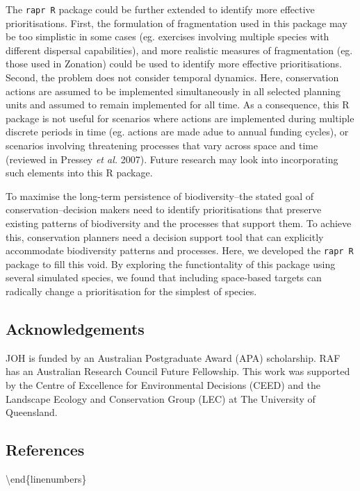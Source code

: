 \documentclass[11pt,]{article}
\begin{document}
The \texttt{rapr R} package could be further extended to identify more
effective prioritisations. First, the formulation of fragmentation used
in this package may be too simplistic in some cases (eg. exercises
involving multiple species with different dispersal capabilities), and
more realistic measures of fragmentation (eg. those used in Zonation)
could be used to identify more effective prioritisations. Second, the
problem does not consider temporal dynamics. Here, conservation actions
are assumed to be implemented simultaneously in all selected planning
units and assumed to remain implemented for all time. As a consequence,
this R package is not useful for scenarios where actions are implemented
during multiple discrete periods in time (eg. actions are made adue to
annual funding cycles), or scenarios involving threatening processes
that vary across space and time (reviewed in Pressey \emph{et al.}
2007). Future research may look into incorporating such elements into
this R package.

To maximise the long-term persistence of biodiversity--the stated goal
of conservation--decision makers need to identify prioritisations that
preserve existing patterns of biodiversity and the processes that
support them. To achieve this, conservation planners need a decision
support tool that can explicitly accommodate biodiversity patterns and
processes. Here, we developed the \texttt{rapr R} package to fill this
void. By exploring the functiontality of this package using several
simulated species, we found that including space-based targets can
radically change a prioritisation for the simplest of species.

\subsection{Acknowledgements}\label{acknowledgements}

JOH is funded by an Australian Postgraduate Award (APA) scholarship. RAF
has an Australian Research Council Future Fellowship. This work was
supported by the Centre of Excellence for Environmental Decisions (CEED)
and the Landscape Ecology and Conservation Group (LEC) at The University
of Queensland.

\subsection{References}\label{references}

\textbackslash{}end\{linenumbers\}
\end{document}
